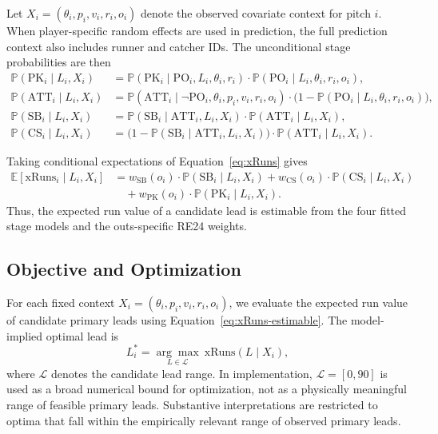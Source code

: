 \documentclass[12pt,letterpaper]{article}
\newcommand{\E}{\mathbb{E}}
\renewcommand{\P}{\mathbb{P}}
\begin{document}
Let $X_i=(\theta_i,p_i,v_i,r_i,o_i)$ denote the observed covariate context for pitch $i$. When player-specific random effects are used in prediction, the full prediction context also includes runner and catcher IDs. The unconditional stage probabilities are then
\begin{align*}
    \P(\mathrm{PK}_i \mid L_i, X_i)
    &= \P(\mathrm{PK}_i \mid \mathrm{PO}_i, L_i, \theta_i, r_i)\cdot
       \P(\mathrm{PO}_i \mid L_i, \theta_i, r_i, o_i), \\
    \P(\mathrm{ATT}_i \mid L_i, X_i)
    &= \P(\mathrm{ATT}_i \mid \neg\mathrm{PO}_i, \theta_i, p_i, v_i, r_i, o_i)\cdot
       \bigl(1-\P(\mathrm{PO}_i \mid L_i, \theta_i, r_i, o_i)\bigr), \\
    \P(\mathrm{SB}_i \mid L_i, X_i)
    &= \P(\mathrm{SB}_i \mid \mathrm{ATT}_i, L_i, X_i)\cdot
       \P(\mathrm{ATT}_i \mid L_i, X_i), \\
    \P(\mathrm{CS}_i \mid L_i, X_i)
    &= \bigl(1-\P(\mathrm{SB}_i \mid \mathrm{ATT}_i, L_i, X_i)\bigr)\cdot
       \P(\mathrm{ATT}_i \mid L_i, X_i).
\end{align*}

Taking conditional expectations of Equation~\ref{eq:xRuns} gives
\begin{align}
    \E[\mathrm{xRuns}_i \mid L_i, X_i]
    &= w_{\mathrm{SB}}(o_i) \cdot \P(\mathrm{SB}_i \mid L_i, X_i)
    + w_{\mathrm{CS}}(o_i) \cdot \P(\mathrm{CS}_i \mid L_i, X_i) \nonumber \\
    &\quad + w_{\mathrm{PK}}(o_i) \cdot \P(\mathrm{PK}_i \mid L_i, X_i). \label{eq:xRuns-estimable}
\end{align}
Thus, the expected run value of a candidate lead is estimable from the four fitted stage models and the outs-specific RE24 weights.

\subsection{Objective and Optimization}

For each fixed context $X_i=(\theta_i,p_i,v_i,r_i,o_i)$, we evaluate the expected run value of candidate primary leads using Equation~\ref{eq:xRuns-estimable}. The model-implied optimal lead is
\begin{equation}
    L_i^* = \underset{L\in\mathcal{L}}{\arg\max}\ \mathrm{xRuns}(L\mid X_i), \label{eq:optimization}
\end{equation}
where $\mathcal{L}$ denotes the candidate lead range. In implementation, $\mathcal{L}=[0,90]$ is used as a broad numerical bound for optimization, not as a physically meaningful range of feasible primary leads. Substantive interpretations are restricted to optima that fall within the empirically relevant range of observed primary leads.
\end{document}
